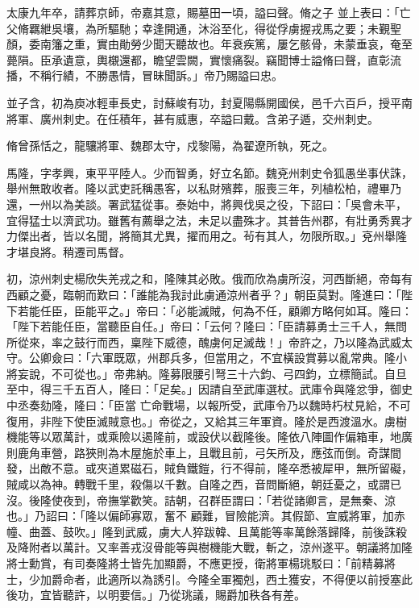 \begin{pinyinscope}
 太康九年卒，請葬京師，帝嘉其意，賜墓田一頃，謚曰聲。脩之子
 並上表曰：「亡父脩羈紲吳壤，為所驅馳；幸逢開通，沐浴至化，得從俘虜握戎馬之要；未覲聖顏，委南籓之重，實由勛勞少聞天聽故也。年衰疾篤，屢乞骸骨，未蒙垂哀，奄至薨隕。臣承遺意，輿櫬還都，瞻望雲闕，實懷痛裂。竊聞博士謚脩曰聲，直彰流播，不稱行績，不勝愚情，冒昧聞訴。」帝乃賜謚曰忠。



 並子含，初為庾冰輕車長史，討蘇峻有功，封夏陽縣開國侯，邑千六百戶，授平南將軍、廣州刺史。在任積年，甚有威惠，卒謚曰戴。含弟子遁，交州刺史。



 脩曾孫恬之，龍驤將軍、魏郡太守，戍黎陽，為翟遼所執，死之。



 馬隆，字孝興，東平平陸人。少而智勇，好立名節。魏兗州刺史令狐愚坐事伏誅，舉州無敢收者。隆以武吏託稱愚客，以私財殯葬，服喪三年，列植松柏，禮畢乃還，一州以為美談。署武猛從事。泰始中，將興伐吳之役，下詔曰：「吳會未平，宜得猛士以濟武功。雖舊有薦舉之法，未足以盡殊才。其普告州郡，有壯勇秀異才力傑出者，皆以名聞，將簡其尤異，擢而用之。茍有其人，勿限所取。」兗州舉隆才堪良將。稍遷司馬督。



 初，涼州刺史楊欣失羌戎之和，隆陳其必敗。俄而欣為虜所沒，河西斷絕，帝每有
 西顧之憂，臨朝而歎曰：「誰能為我討此虜通涼州者乎？」朝臣莫對。隆進曰：「陛下若能任臣，臣能平之。」帝曰：「必能滅賊，何為不任，顧卿方略何如耳。隆曰：「陛下若能任臣，當聽臣自任。」帝曰：「云何？隆曰：「臣請募勇士三千人，無問所從來，率之鼓行而西，稟陛下威德，醜虜何足滅哉！」帝許之，乃以隆為武威太守。公卿僉曰：「六軍既眾，州郡兵多，但當用之，不宜橫設賞募以亂常典。隆小將妄說，不可從也。」帝弗納。隆募限腰引弩三十六鈞、弓四鈞，立標簡試。自旦至中，得三千五百人，隆曰：「足矣。」因請自至武庫選杖。武庫令與隆忿爭，御史中丞奏劾隆，隆曰：「臣當
 亡命戰場，以報所受，武庫令乃以魏時朽杖見給，不可復用，非陛下使臣滅賊意也。」帝從之，又給其三年軍資。隆於是西渡溫水。虜樹機能等以眾萬計，或乘險以遏隆前，或設伏以截隆後。隆依八陣圖作偏箱車，地廣則鹿角車營，路狹則為木屋施於車上，且戰且前，弓矢所及，應弦而倒。奇謀間發，出敵不意。或夾道累磁石，賊負鐵鎧，行不得前，隆卒悉被犀甲，無所留礙，賊咸以為神。轉戰千里，殺傷以千數。自隆之西，音問斷絕，朝廷憂之，或謂已沒。後隆使夜到，帝撫掌歡笑。詰朝，召群臣謂曰：「若從諸卿言，是無秦、涼也。」乃詔曰：「隆以偏師寡眾，奮不
 顧難，冒險能濟。其假節、宣威將軍，加赤幢、曲蓋、鼓吹。」隆到武威，虜大人猝跋韓、且萬能等率萬餘落歸降，前後誅殺及降附者以萬計。又率善戎沒骨能等與樹機能大戰，斬之，涼州遂平。朝議將加隆將士勳賞，有司奏隆將士皆先加顯爵，不應更授，衛將軍楊珧駁曰：「前精募將士，少加爵命者，此適所以為誘引。今隆全軍獨剋，西土獲安，不得便以前授塞此後功，宜皆聽許，以明要信。」乃從珧議，賜爵加秩各有差。




\end{pinyinscope}
